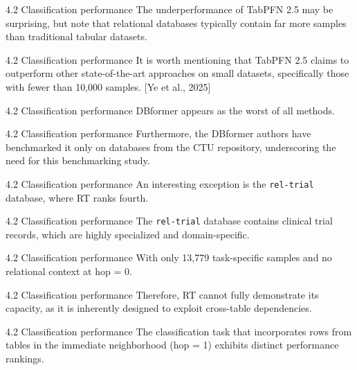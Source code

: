 \documentclass[aspectratio=169,10pt]{beamer}
\newcommand{\cit}[1]{{\scriptsize\color{gray}[#1]}}
\begin{document}
\begin{frame}{4.2 Classification performance}
The underperformance of TabPFN 2.5 may be surprising, but note that relational databases typically contain far more samples than traditional tabular datasets.
\end{frame}

\begin{frame}{4.2 Classification performance}
It is worth mentioning that TabPFN 2.5 claims to outperform other state-of-the-art approaches on small datasets, specifically those with fewer than 10,000 samples.
\cit{Ye et al., 2025}
\end{frame}

\begin{frame}{4.2 Classification performance}
DBformer appears as the worst of all methods.
\end{frame}

\begin{frame}{4.2 Classification performance}
Furthermore, the DBformer authors have benchmarked it only on databases from the CTU repository, underscoring the need for this benchmarking study.
\end{frame}

\begin{frame}{4.2 Classification performance}
An interesting exception is the \texttt{rel-trial} database, where RT ranks fourth.
\end{frame}

\begin{frame}{4.2 Classification performance}
The \texttt{rel-trial} database contains clinical trial records, which are highly specialized and domain-specific.
\end{frame}

\begin{frame}{4.2 Classification performance}
With only 13,779 task-specific samples and no relational context at hop = 0.
\end{frame}

\begin{frame}{4.2 Classification performance}
Therefore, RT cannot fully demonstrate its capacity, as it is inherently designed to exploit cross-table dependencies.
\end{frame}

\begin{frame}{4.2 Classification performance}
The classification task that incorporates rows from tables in the immediate neighborhood (hop = 1) exhibits distinct performance rankings.
\end{frame}
\end{document}
